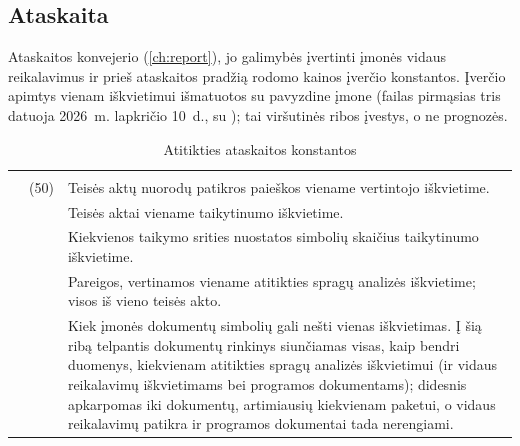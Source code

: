 \subsection{Ataskaita}\label{sec:config:report}

Ataskaitos konvejerio (\cref{ch:report}), jo galimybės įvertinti įmonės vidaus reikalavimus ir
prieš ataskaitos pradžią rodomo kainos įverčio konstantos. Įverčio apimtys vienam iškvietimui
išmatuotos su pavyzdine įmone \demo{} (failas pirmąsias tris datuoja 2026~m. lapkričio 10~d., su
); tai viršutinės ribos įvestys, o ne prognozės.

\begin{xltabular}{\textwidth}{@{}L{44mm}L{19mm}Y@{}}
\caption{Atitikties ataskaitos konstantos}\label{tab:config:report}\\
\toprule
{} &  &  \\
\midrule
\endfirsthead
\toprule
{} &  &  \\
\midrule
\endhead
\bottomrule
\endlastfoot
{} &  (50) & Teisės aktų nuorodų patikros paieškos viename vertintojo iškvietime. \\
 &  & Teisės aktai viename taikytinumo iškvietime. \\
 &  & Kiekvienos taikymo srities nuostatos simbolių skaičius taikytinumo iškvietime. \\
 &  & Pareigos, vertinamos viename atitikties spragų analizės iškvietime; visos iš vieno teisės akto. \\
 &  & Kiek įmonės dokumentų simbolių gali nešti vienas iškvietimas. Į šią ribą telpantis dokumentų rinkinys siunčiamas visas, kaip bendri duomenys, kiekvienam atitikties spragų analizės iškvietimui (ir vidaus reikalavimų iškvietimams bei programos dokumentams); didesnis apkarpomas iki dokumentų, artimiausių kiekvienam paketui, o vidaus reikalavimų patikra ir programos dokumentai tada nerengiami. \\

\end{xltabular}
